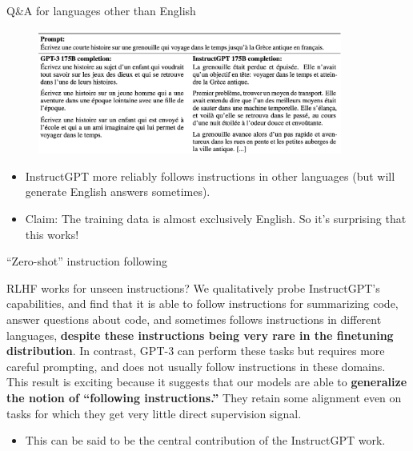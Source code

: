 \begin{vbframe}{Q\&A for languages other than English}

\vfill

\begin{figure}
\centering
\includegraphics[width = 10cm]{figure/nonenglish.png}
\end{figure}

\begin{itemize}
	\item InstructGPT more reliably follows instructions
	in other languages (but will generate English
	answers sometimes).
        \item Claim: The training data is almost exclusively
	English. So it's surprising that this works!
\end{itemize}

\vfill

\end{vbframe}

\begin{vbframe}{``Zero-shot'' instruction following}



\begin{block}{RLHF works for unseen instructions?}
We qualitatively probe InstructGPT’s capabilities, and find
that it is able to follow instructions for summarizing code,
answer questions about code, and sometimes follows
instructions in different languages, \textbf{despite these
instructions being very rare in the finetuning
distribution}. In contrast, GPT-3 can perform these tasks but
requires more careful prompting, and does not usually follow
instructions in these domains. This result is exciting
because it suggests that our models are able to \textbf{generalize
the notion of “following instructions.”} They retain some
alignment even on tasks for which they get very little
direct supervision signal.
\end{block}


\begin{itemize}
	\item This can be said to be the central contribution
	of the InstructGPT work.
\end{itemize}

\vfill


\end{vbframe}





